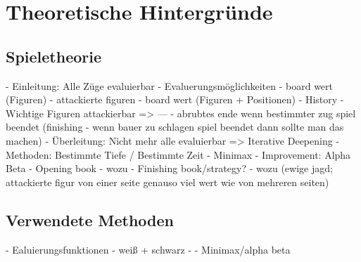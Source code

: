 \chapter{Theoretische Hintergründe}

\section{Spieletheorie}
- Einleitung: Alle Züge evaluierbar
- Evaluerungsmöglichkeiten
   - board wert (Figuren)
   - attackierte figuren
   - board wert (Figuren + Positionen)
   - History
   - Wichtige Figuren attackierbar => ---
   - abrubtes ende wenn bestimmter zug spiel beendet (finishing - wenn bauer zu schlagen spiel beendet dann sollte man das machen)
- Überleitung: Nicht mehr alle evaluierbar => Iterative Deepening
- Methoden: Bestimmte Tiefe / Bestimmte Zeit
- Minimax
- Improvement: Alpha Beta
- Opening book
   - wozu
- Finishing book/strategy?
   - wozu (ewige jagd; attackierte figur von einer seite genauso viel wert wie von mehreren seiten)


\section{Verwendete Methoden}
- Ealuierungsfunktionen - weiß + schwarz -
- Minimax/alpha beta
